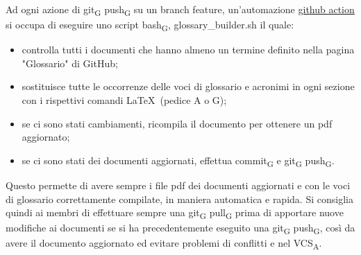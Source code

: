     Ad ogni azione di git\textsubscript{G} push\textsubscript{G} su un branch feature, un'automazione \href{https://docs.github.com/en/free-pro-team@latest/actions}{github action} si occupa di eseguire uno script bash\textsubscript{G}, glossary\_builder.sh il quale:
    \begin{itemize}
        \item controlla tutti i documenti che hanno almeno un termine definito nella pagina "Glossario" di GitHub;
        \item sostituisce tutte le occorrenze delle voci di glossario e acronimi in ogni sezione con i rispettivi comandi \LaTeX{}\ (pedice A o G);
        \item se ci sono stati cambiamenti, ricompila il documento per ottenere un pdf aggiornato;
        \item se ci sono stati dei documenti aggiornati, effettua commit\textsubscript{G} e git\textsubscript{G} push\textsubscript{G}.
    \end{itemize}
    Questo permette di avere sempre i file pdf dei documenti aggiornati e con le voci di glossario correttamente compilate, in maniera automatica e rapida. Si consiglia quindi ai membri di effettuare sempre una git\textsubscript{G} pull\textsubscript{G} prima di apportare nuove modifiche ai documenti se si ha precedentemente eseguito una git\textsubscript{G} push\textsubscript{G}, così da avere il documento aggiornato ed evitare problemi di conflitti e nel VCS\textsubscript{A}.
